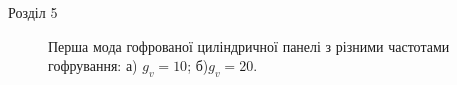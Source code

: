 \documentclass[handout, 8pt]{beamer}
\numberwithin{figure}{section}
\numberwithin{equation}{section}
\numberwithin{table}{section}
\begin{document}
\begin{frame}{Розділ 5}
\begin{figure}[h]
\begin{minipage}[h]{0.49\linewidth}
\end{minipage}
\hfill
\begin{minipage}[h]{0.49\linewidth}
\end{minipage}
\caption{Перша мода гофрованої циліндричної панелі з різними частотами гофрування: а) $g_v=10$; б)$g_v=20$.}
\end{figure}


\end{frame}
\end{document}
